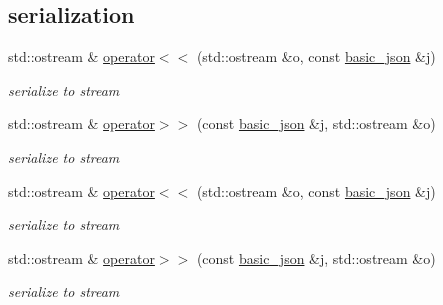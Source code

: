 \subsection*{serialization}
\begin{DoxyCompactItemize}
\item 
std\-::ostream \& \hyperlink{classnlohmann_1_1basic__json_a5e34c5435e557d0bf666bd7311211405}{operator$<$$<$} (std\-::ostream \&o, const \hyperlink{classnlohmann_1_1basic__json}{basic\-\_\-json} \&j)
\begin{DoxyCompactList}\small\item\em serialize to stream \end{DoxyCompactList}\item 
std\-::ostream \& \hyperlink{classnlohmann_1_1basic__json_a34d6a60dd99e9f33b8273a1c8db5669b}{operator$>$$>$} (const \hyperlink{classnlohmann_1_1basic__json}{basic\-\_\-json} \&j, std\-::ostream \&o)
\begin{DoxyCompactList}\small\item\em serialize to stream \end{DoxyCompactList}\item 
std\-::ostream \& \hyperlink{classnlohmann_1_1basic__json_a5e34c5435e557d0bf666bd7311211405}{operator$<$$<$} (std\-::ostream \&o, const \hyperlink{classnlohmann_1_1basic__json}{basic\-\_\-json} \&j)
\begin{DoxyCompactList}\small\item\em serialize to stream \end{DoxyCompactList}\item 
std\-::ostream \& \hyperlink{classnlohmann_1_1basic__json_a34d6a60dd99e9f33b8273a1c8db5669b}{operator$>$$>$} (const \hyperlink{classnlohmann_1_1basic__json}{basic\-\_\-json} \&j, std\-::ostream \&o)
\begin{DoxyCompactList}\small\item\em serialize to stream \end{DoxyCompactList}\end{DoxyCompactItemize}
